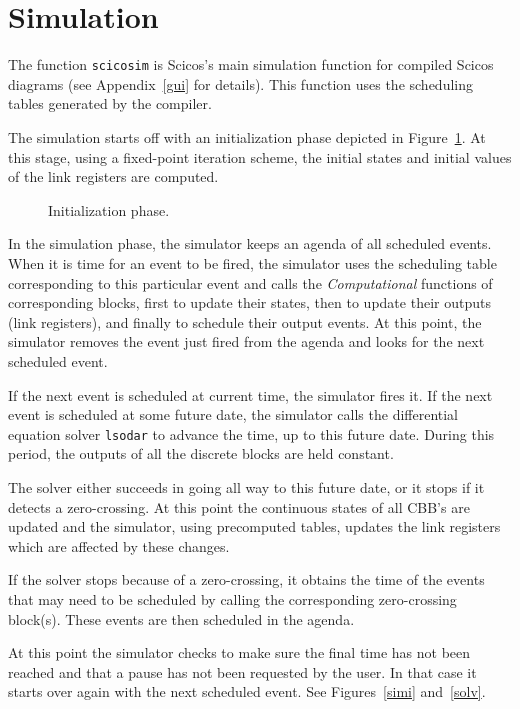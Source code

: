 \documentclass{book}
\newcommand{\computational}{{\em Computational }}
\begin{document}
\section{Simulation}
The function {\tt scicosim} is Scicos's main simulation function
for compiled Scicos  diagrams (see Appendix~\ref{gui} for details).
This function uses the scheduling tables generated by the compiler.

The simulation starts off with an initialization phase depicted in
Figure~\ref{initi}. At this stage, using a fixed-point iteration
scheme, the initial states and initial values of the link registers
are computed. 


\begin{figure}[ht]

\caption{Initialization phase.}
\label{initi}
\end{figure}

\bigskip

In the simulation phase, the simulator keeps an agenda of all scheduled events. 
When it is time for an  event to be fired, the simulator uses the
scheduling table corresponding to this particular event and
calls the \computational functions of corresponding blocks, first
to update their states, then to update their outputs (link registers),
and finally to schedule their output events. At this point, the
simulator removes the event just fired from the agenda and looks
for the next scheduled event.

If the next event is scheduled at current time, the simulator fires it.
If the next event is scheduled at some future date, the simulator calls
the differential equation solver {\tt lsodar} \cite{ls1,ls2} to
advance the time, up to 
this future date. During this period, the outputs of all the discrete
blocks are held constant. 

The solver either succeeds in going all way to this future date, or
it stops if it detects a zero-crossing. At this point the continuous states
of all CBB's are updated and the simulator, using precomputed tables,
updates the link registers which are affected by these changes. 

If the solver stops because of a zero-crossing, it obtains the time of 
the events that may need to be scheduled by calling the corresponding zero-crossing
block(s). These events are then scheduled in the agenda.

At this point the simulator checks to make sure the final time has not been
reached and that a pause has not been requested by the user. In that case
it starts over again with the next scheduled event. See
Figures~\ref{simi} and~\ref{solv}.
\end{document}
